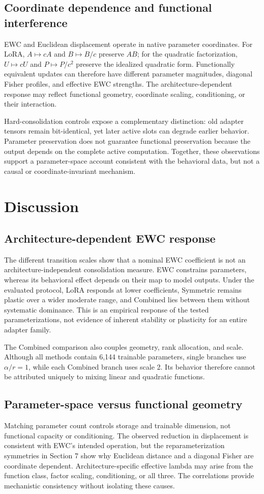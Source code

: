\documentclass[12pt,a4paper]{article}
\begin{document}
\subsection{Coordinate dependence and functional interference}
EWC and Euclidean displacement operate in native parameter coordinates. For LoRA, \(A\mapsto cA\) and \(B\mapsto B/c\) preserve \(AB\); for the quadratic factorization, \(U\mapsto cU\) and \(P\mapsto P/c^2\) preserve the idealized quadratic form. Functionally equivalent updates can therefore have different parameter magnitudes, diagonal Fisher profiles, and effective EWC strengths. The architecture-dependent response may reflect functional geometry, coordinate scaling, conditioning, or their interaction.

Hard-consolidation controls expose a complementary distinction: old adapter tensors remain bit-identical, yet later active slots can degrade earlier behavior. Parameter preservation does not guarantee functional preservation because the output depends on the complete active computation. Together, these observations support a parameter-space account consistent with the behavioral data, but not a causal or coordinate-invariant mechanism.

\section{Discussion}
\subsection{Architecture-dependent EWC response}
The different transition scales show that a nominal EWC coefficient is not an architecture-independent consolidation measure. EWC constrains parameters, whereas its behavioral effect depends on their map to model outputs. Under the evaluated protocol, LoRA responds at lower coefficients, Symmetric remains plastic over a wider moderate range, and Combined lies between them without systematic dominance. This is an empirical response of the tested parameterizations, not evidence of inherent stability or plasticity for an entire adapter family.

The Combined comparison also couples geometry, rank allocation, and scale. Although all methods contain 6,144 trainable parameters, single branches use \(\alpha/r=1\), while each Combined branch uses scale 2. Its behavior therefore cannot be attributed uniquely to mixing linear and quadratic functions.

\subsection{Parameter-space versus functional geometry}
Matching parameter count controls storage and trainable dimension, not functional capacity or conditioning. The observed reduction in displacement is consistent with EWC's intended operation, but the reparameterization symmetries in Section 7 show why Euclidean distance and a diagonal Fisher are coordinate dependent. Architecture-specific effective lambda may arise from the function class, factor scaling, conditioning, or all three. The correlations provide mechanistic consistency without isolating these causes.
\end{document}
